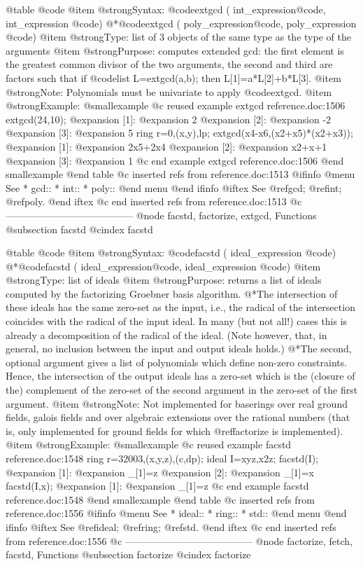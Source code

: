 @table @code
@item @strong{Syntax:}
@code{extgcd (} int_expression@code{,} int_expression @code{)}
@*@code{extgcd (} poly_expression@code{,} poly_expression @code{)}
@item @strong{Type:}
list of 3 objects of the same type as the type of the arguments
@item @strong{Purpose:}
computes extended gcd: the first element is the greatest common divisor
of the two arguments,
the second and third are factors such that if @code{list L=extgcd(a,b);}
then L[1]=a*L[2]+b*L[3].
@item @strong{Note:}
Polynomials must be univariate to apply @code{extgcd}.
@item @strong{Example:}
@smallexample
@c reused example extgcd reference.doc:1506 
  extgcd(24,10);
@expansion{} [1]:
@expansion{}    2
@expansion{} [2]:
@expansion{}    -2
@expansion{} [3]:
@expansion{}    5
  ring r=0,(x,y),lp;
  extgcd(x4-x6,(x2+x5)*(x2+x3));
@expansion{} [1]:
@expansion{}    2x5+2x4
@expansion{} [2]:
@expansion{}    x2+x+1
@expansion{} [3]:
@expansion{}    1
@c end example extgcd reference.doc:1506
@end smallexample
@end table
@c inserted refs from reference.doc:1513
@ifinfo
@menu
See
* gcd::
* int::
* poly::
@end menu
@end ifinfo
@iftex
See
@ref{gcd};
@ref{int};
@ref{poly}.
@end iftex
@c end inserted refs from reference.doc:1513
@c ---------------------------------------
@node facstd, factorize, extgcd, Functions
@subsection facstd
@cindex facstd

@table @code
@item @strong{Syntax:}
@code{facstd (} ideal_expression @code{)}
@*@code{facstd (} ideal_expression@code{,} ideal_expression @code{)}
@item @strong{Type:}
list of ideals
@item @strong{Purpose:}
returns a list of ideals computed by the factorizing Groebner basis algorithm.
@*The intersection of these ideals has the same zero-set as the input,
i.e., the radical of the intersection coincides with the radical of the input
ideal.
In many (but not all!) cases this is already a decomposition of the radical
of the ideal. (Note however, that, in general, no inclusion between the
input and output ideals holds.)
@*The second, optional argument gives a list of polynomials which define
non-zero constraints. Hence, the intersection of the output ideals
has a zero-set which is the (closure of the) complement of the zero-set
of the second argument in the zero-set of the first argument.
@item @strong{Note:}
Not implemented for baserings over real ground fields, galois fields and
over algebraic extensions over the rational numbers (that is, only
implemented for ground fields for which @ref{factorize} is implemented).
@item @strong{Example:}
@smallexample
@c reused example facstd reference.doc:1548 
  ring r=32003,(x,y,z),(c,dp);
  ideal I=xyz,x2z;
  facstd(I);
@expansion{} [1]:
@expansion{}    _[1]=z
@expansion{} [2]:
@expansion{}    _[1]=x
  facstd(I,x);
@expansion{} [1]:
@expansion{}    _[1]=z
@c end example facstd reference.doc:1548
@end smallexample
@end table
@c inserted refs from reference.doc:1556
@ifinfo
@menu
See
* ideal::
* ring::
* std::
@end menu
@end ifinfo
@iftex
See
@ref{ideal};
@ref{ring};
@ref{std}.
@end iftex
@c end inserted refs from reference.doc:1556
@c ---------------------------------------
@node factorize, fetch, facstd, Functions
@subsection factorize
@cindex factorize

